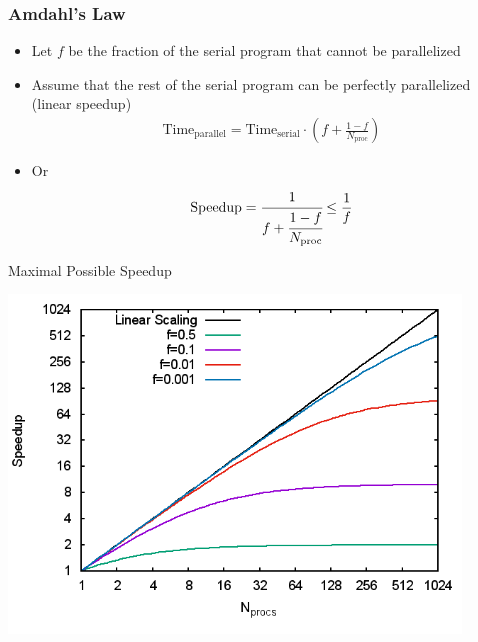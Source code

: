 \documentclass[10pt,t]{beamer}
\begin{document}
\begin{frame}
  \frametitle{Amdahl's Law}
  \begin{itemize}
  \item Let $f$ be the fraction of the serial program that cannot be parallelized
  \item Assume that the rest of the serial program can be perfectly parallelized (linear speedup)
    \begin{gather*}
      \mathrm{Time}_\mathrm{parallel} = \mathrm{Time}_\mathrm{serial}\cdot\left(f +\frac{1-f}{N_\mathrm{proc}}\right)
    \end{gather*}
  \item Or
    \begin{gather*}
      \mathrm{Speedup} = \cfrac{1}{f+\cfrac{1-f}{N_\mathrm{proc}}}\le\frac{1}{f}
    \end{gather*}
  \end{itemize}
\end{frame}

\begin{frame}{Maximal Possible Speedup}
  \begin{center}
    \includegraphics[width=0.9\textwidth]{./amdahl}
  \end{center}
\end{frame}
\end{document}
